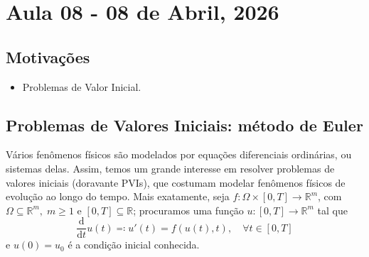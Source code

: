 \documentclass[../differential_methods.tex]{subfiles}
\begin{document}
\section{Aula 08 - 08 de Abril, 2026}
\subsection{Motivações}
\begin{itemize}
	\item Problemas de Valor Inicial.
\end{itemize}
\subsection{Problemas de Valores Iniciais: método de Euler}
Vários fenômenos físicos são modelados por equações diferenciais ordinárias, ou sistemas delas. Assim, temos um grande interesse em resolver problemas de valores iniciais (doravante PVIs), que costumam modelar fenômenos físicos de evolução ao longo do tempo.
Mais exatamente, seja \(f:\Omega \times [0,T]\rightarrow \mathbb{R}^{m}\), com \(\Omega \subseteq \mathbb{R}^{m},\; m\geq 1\) e \([0, T]\subseteq \mathbb{R}\); procuramos uma função \(u:[0,T]\rightarrow \mathbb{R}^{m}\) tal que
\[
	\frac{\mathrm{d}}{\mathrm{d}t}u(t)\eqqcolon u'(t) = f(u(t), t),\quad \forall t\in [0,T]
\]
e \(u(0)=u_{0}\) é a condição inicial conhecida.
\end{document}
